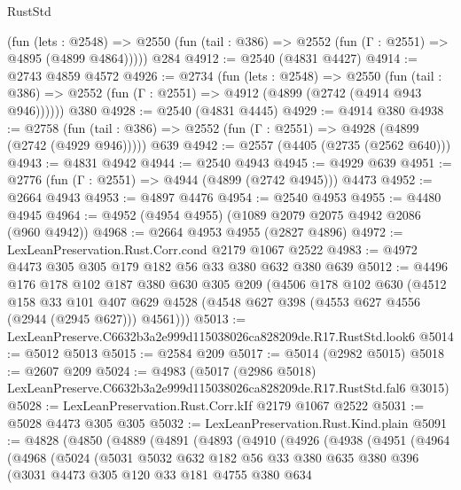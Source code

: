 \begin{lexlean}{RustStd}
\begin{coremodule}
      (fun (lets : @2548) =>
      @2550 (fun (tail : @386) => @2552 (fun (Γ : @2551) => @4895 (@4899 @4864)))))
    @284
@4912 := @2540 (@4831 @4427)
@4914 := @2743 @4859 @4572
@4926 := @2734
    (fun (lets : @2548) =>
    @2550 (fun (tail : @386) => @2552 (fun (Γ : @2551) => @4912 (@4899 (@2742 (@4914 @943 @946))))))
    @380
@4928 := @2540 (@4831 @4445)
@4929 := @4914 @380
@4938 := @2758
    (fun (tail : @386) => @2552 (fun (Γ : @2551) => @4928 (@4899 (@2742 (@4929 @946)))))
    @639
@4942 := @2557 (@4405 (@2735 (@2562 @640)))
@4943 := @4831 @4942
@4944 := @2540 @4943
@4945 := @4929 @639
@4951 := @2776 (fun (Γ : @2551) => @4944 (@4899 (@2742 @4945))) @4473
@4952 := @2664 @4943
@4953 := @4897 @4476
@4954 := @2540 @4953
@4955 := @4480 @4945
@4964 := @4952 (@4954 @4955) (@1089 @2079 @2075 @4942 @2086 (@960 @4942))
@4968 := @2664 @4953 @4955 (@2827 @4896)
@4972 := LexLeanPreservation.Rust.Corr.cond @2179 @1067 @2522
@4983 := @4972 @4473 @305 @305 @179 @182 @56 @33 @380 @632 @380 @639
@5012 := @4496
    @176
    @178
    @102
    @187
    @380
    @630
    @305
    @209
    (@4506
      @178
      @102
      @630
      (@4512
        @158
        @33
        @101
        @407
        @629
        @4528
        (@4548 @627 @398 (@4553 @627 @4556 (@2944 (@2945 @627))) @4561)))
@5013 := LexLeanPreserve.C6632b3a2e999d115038026ca828209de.R17.RustStd.look6
@5014 := @5012 @5013
@5015 := @2584 @209
@5017 := @5014 (@2982 @5015)
@5018 := @2607 @209
@5024 := @4983
    (@5017 (@2986 @5018) LexLeanPreserve.C6632b3a2e999d115038026ca828209de.R17.RustStd.fal6 @3015)
@5028 := LexLeanPreservation.Rust.Corr.kIf @2179 @1067 @2522
@5031 := @5028 @4473 @305 @305
@5032 := LexLeanPreservation.Rust.Kind.plain
@5091 := @4828
    (@4850
      (@4889
        (@4891
          (@4893
            (@4910
              (@4926
                (@4938
                  (@4951
                    (@4964
                      (@4968
                        (@5024
                          (@5031
                            @5032
                            @632
                            @182
                            @56
                            @33
                            @380
                            @635
                            @380
                            @396
                            (@3031
                              @4473
                              @305
                              @120
                              @33
                              @181
                              @4755
                              @380
                              @634

\end{coremodule}
\end{lexlean}
